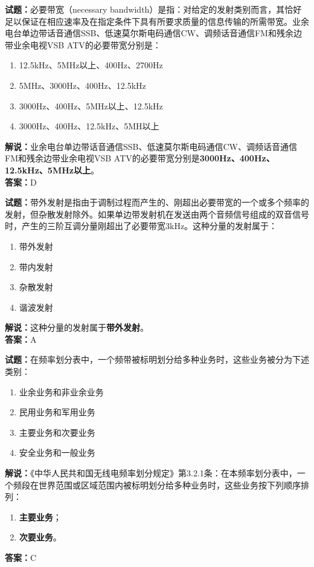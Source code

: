 \documentclass{ctexbook}
\begin{document}
\noindent\textbf{试题：}必要带宽（necessary bandwidth）是指：对给定的发射类别而言，其恰好足以保证在相应速率及在指定条件下具有所要求质量的信息传输的所需带宽。业余电台单边带话音通信SSB、低速莫尔斯电码通信CW、调频话音通信FM和残余边带业余电视VSB ATV的必要带宽分别是： 
\begin{enumerate}[leftmargin=3em]
\item 12.5\unit{\kHz}、5\unit{\MHz}以上、400Hz、2700Hz
\item 5\unit{\MHz}、3000Hz、400Hz、12.5\unit{\kHz}
\item 3000Hz、400Hz、5\unit{\MHz}以上、12.5\unit{\kHz}
\item 3000Hz、400Hz、12.5\unit{\kHz}、5MH以上
\end{enumerate}
\noindent\textbf{解说：}业余电台单边带话音通信SSB、低速莫尔斯电码通信CW、调频话音通信FM和残余边带业余电视VSB ATV的必要带宽分别是\textbf{3000Hz、400Hz、12.5\unit{\kHz}、5\unit{\MHz}以上}。\\\noindent\textbf{答案：}D

\bigskip




\noindent\textbf{试题：}带外发射是指由于调制过程而产生的、刚超出必要带宽的一个或多个频率的发射，但杂散发射除外。如果单边带发射机在发送由两个音频信号组成的双音信号时，产生的三阶互调分量刚超出了必要带宽3\unit{\kHz}。这种分量的发射属于：
\begin{enumerate}[leftmargin=3em]
\item 带外发射
\item 带内发射
\item 杂散发射
\item 谐波发射
\end{enumerate}
\noindent\textbf{解说：}这种分量的发射属于\textbf{带外发射}。\\\noindent\textbf{答案：}A


\bigskip




\noindent\textbf{试题：}在频率划分表中，一个频带被标明划分给多种业务时，这些业务被分为下述类别：
\begin{enumerate}[leftmargin=3em]
\item 业余业务和非业余业务
\item 民用业务和军用业务
\item 主要业务和次要业务
\item 安全业务和一般业务
\end{enumerate}
\noindent\textbf{解说：}《中华人民共和国无线电频率划分规定》第3.2.1条：在本频率划分表中，一个频段在世界范围或区域范围内被标明划分给多种业务时，这些业务按下列顺序排列：
\begin{enumerate}[leftmargin=3em, label=\alph*)]
	\item \textbf{主要业务}；
	\item \textbf{次要业务}。
\end{enumerate}
\textbf{答案：}C
\end{document}
